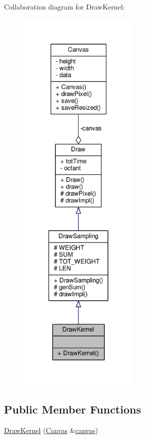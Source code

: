 Collaboration diagram for Draw\+Kernel\+:
\nopagebreak
\begin{figure}[H]
\begin{center}
\leavevmode
\includegraphics[height=550pt]{classDrawKernel__coll__graph}
\end{center}
\end{figure}
\subsection*{Public Member Functions}
\begin{DoxyCompactItemize}
\item 
\hyperlink{classDrawKernel_a5f419bac95daf351c15a12517df229a6}{Draw\+Kernel} (\hyperlink{classCanvas}{Canvas} \&\hyperlink{classDraw_a72ed77716d9eb7068414f0e4e00753bd}{canvas})
\end{DoxyCompactItemize}
